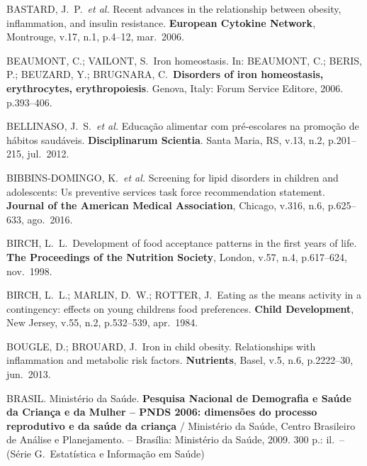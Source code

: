 \bigbreak

\noindent BASTARD, J.\ P.\ \textit{et al.} Recent advances in the relationship between obesity, inflammation, and insulin resistance. \textbf{European Cytokine Network}, Montrouge, v.17, n.1, p.4--12, mar.\ 2006.

\bigbreak

\noindent BEAUMONT, C.; VAILONT, S.\ Iron homeostasis. In: BEAUMONT, C.; BERIS, P.; BEUZARD, Y.; BRUGNARA, C.\ \textbf{Disorders of iron homeostasis, erythrocytes, erythropoiesis}. Genova, Italy: Forum Service Editore, 2006. p.393--406.

\bigbreak

\noindent BELLINASO, J.\ S.\ \textit{et al.} Educação alimentar com pré-escolares na promoção de hábitos saudáveis. \textbf{Disciplinarum Scientia}. Santa Maria, RS, v.13, n.2, p.201--215, jul.\ 2012.

\bigbreak

\noindent BIBBINS-DOMINGO, K.\ \textit{et al.} Screening for lipid disorders in children and adolescents: Us preventive services task force recommendation statement. \textbf{Journal of the American Medical Association}, Chicago, v.316, n.6, p.625--633, ago.\ 2016. 

\bigbreak
 
\noindent BIRCH, L.\ L.\ Development of food acceptance patterns in the first years of life. \textbf{The Proceedings of the Nutrition Society}, London, v.57, n.4, p.617--624, nov.\ 1998. 

\bigbreak

\noindent BIRCH, L.\ L.; MARLIN, D.\ W.; ROTTER, J.\ Eating as the means activity in a contingency: effects on young childrens food preferences. \textbf{Child Development}, New Jersey, v.55, n.2, p.532--539, apr.\ 1984.

\bigbreak

\noindent BOUGLE, D.; BROUARD, J.\ Iron in child obesity. Relationships with inflammation and metabolic risk factors. \textbf{Nutrients}, Basel, v.5, n.6, p.2222–30, jun.\ 2013.

\bigbreak

\noindent BRASIL. Ministério da Saúde. \textbf{Pesquisa Nacional de Demografia e Saúde da Criança e da Mulher – PNDS 2006: dimensões do processo reprodutivo e da saúde da criança} / Ministério da Saúde, Centro Brasileiro de Análise e Planejamento. – Brasília: Ministério da Saúde, 2009. 300 p.: il.\ – (Série G.\ Estatística e Informação em Saúde)

\bigbreak

